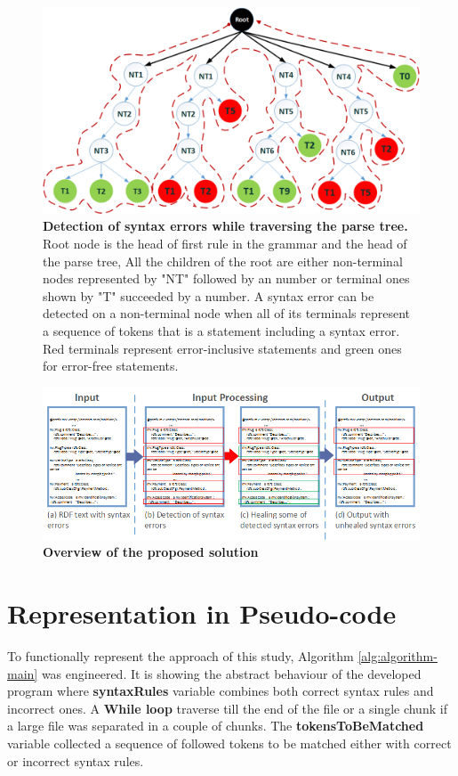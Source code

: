 \begin{figure}
	\centering
	  	\includegraphics[width=.8\textwidth]{images/approachParseTree.png}
		\caption{\textbf{Detection of syntax errors while traversing the parse tree.} Root node is the head of first rule in the grammar and the head of the parse tree, All the children of the root are either  non-terminal nodes represented by "NT" followed by an number or  terminal ones shown by "T" succeeded by a number. A syntax error can be detected on a non-terminal node when all of its terminals represent a sequence of tokens that is a statement including a syntax error. Red terminals represent error-inclusive statements and green ones for error-free statements.}
		\label{Fig:approachParseTree}  
\end{figure}

\begin{figure}
	\centering
	  	\includegraphics[width=1\textwidth]{images/Approach.png}
		\caption{\textbf{Overview of the proposed solution}}
		\label{Fig:Approach}  
\end{figure}
\section{Representation in Pseudo-code}
To functionally represent the approach of this study, Algorithm \ref{alg:algorithm-main} was engineered. It is showing the abstract behaviour of the developed program where \textbf{syntaxRules} variable combines both correct syntax rules and incorrect ones. A \textbf{While loop} traverse till the end of the file or a single chunk if a large file was separated in a couple of chunks. The \textbf{tokensToBeMatched}  variable collected a sequence of followed tokens to be matched either with correct or incorrect syntax rules.

